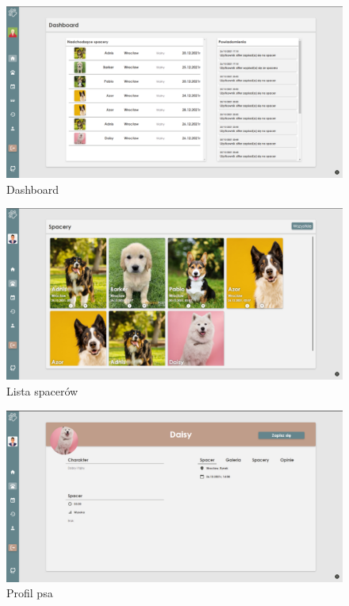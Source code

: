 \begin{figure}[H]
  \centering
  \includegraphics[width=1\linewidth]{rysunki/walker-2.PNG}
  \caption{Dashboard}
  \label{fig:walker-dashboard}
\end{figure}


\begin{figure}[H]
  \centering
  \includegraphics[width=1\linewidth]{rysunki/walker-3.PNG}
  \caption{Lista spacerów}
  \label{fig:walker-walk-list}
\end{figure}


\begin{figure}[H]
  \centering
  \includegraphics[width=1\linewidth]{rysunki/walker-4.PNG}
  \caption{Profil psa}
  \label{fig:walker-dog-profile}
\end{figure}


